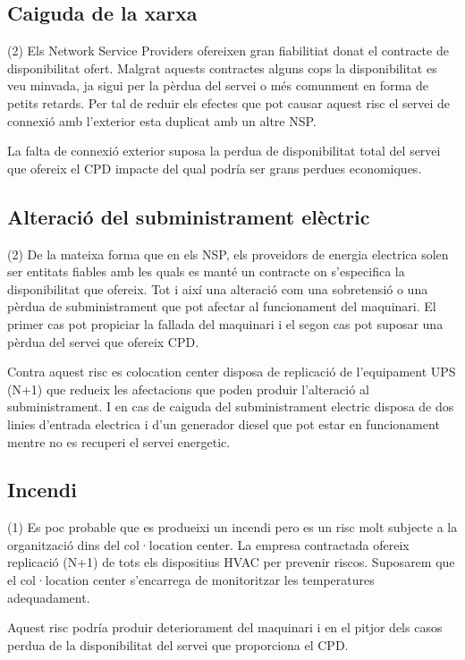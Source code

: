 \documentclass[a4paper, 11pt]{article}
\begin{document}
\subsection{Caiguda de la xarxa}
(2) Els Network Service Providers ofereixen gran fiabilitiat donat el contracte de disponibilitat ofert. Malgrat aquests contractes alguns cops la disponibilitat es veu minvada, ja sigui per la pèrdua del servei o més comunment en forma de petits retards. Per tal de reduir els efectes que pot causar aquest risc el servei de connexió amb l'exterior esta duplicat amb un altre NSP. 

La falta de connexió exterior suposa la perdua de disponibilitat total del servei que ofereix el CPD impacte del qual podría ser grans perdues economiques.

\subsection{Alteració del subministrament elèctric}
(2) De la mateixa forma que en els NSP, els proveidors de energia electrica solen ser entitats fiables amb les quals es manté un contracte on s'especifica la disponibilitat que ofereix. Tot i així una alteració com una sobretensió o una pèrdua de subministrament que pot afectar al funcionament del maquinari. El primer cas pot propiciar la fallada del maquinari i el segon cas pot suposar una pèrdua del servei que ofereix CPD.

Contra aquest risc es colocation center disposa de replicació de l'equipament UPS (N+1) que redueix les afectacions que poden produir l'alteració al subministrament. I en cas de caiguda del subministrament electric disposa de dos linies d'entrada electrica i d'un generador diesel que pot estar en funcionament mentre no es recuperi el servei energetic.

\subsection{Incendi}
(1) Es poc probable que es produeixi un incendi pero es un risc molt subjecte a la organització dins del col·location center. La empresa contractada ofereix replicació (N+1) de tots els dispositius HVAC per prevenir riscos. Suposarem que el col·location center s'encarrega de monitoritzar les temperatures adequadament.

Aquest risc podría produir deteriorament del maquinari i en el pitjor dels casos perdua de la disponibilitat del servei que proporciona el CPD. 
\end{document}
